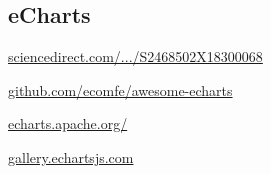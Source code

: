 \subsection{eCharts}
    \begin{description}[font=\normalfont,itemsep=0pt]
        \item[Paper]
            \href{https://www.sciencedirect.com/science/article/pii/S2468502X18300068}{sciencedirect.com/.../S2468502X18300068}

        \item[Github]
            \href{https://github.com/ecomfe/awesome-echarts}{github.com/ecomfe/awesome-echarts}

        \item[Apache]
            \href{http://echarts.apache.org/}{echarts.apache.org/}

        \item[Gallery]
            \href{https://gallery.echartsjs.com/}{gallery.echartsjs.com}

    \end{description}



